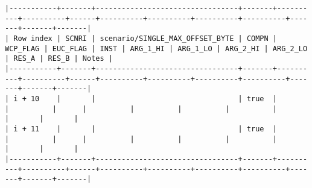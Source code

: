 \documentclass[varwidth=\maxdimen,margin=0.5cm,multi={verbatim}]{standalone}
\begin{document}
\begin{verbatim}
|-----------+-------+---------------------------------+-------+----------+----------+------+----------+----------+----------+----------+-------+-------+-------|
| Row index | SCNRI | scenario/SINGLE_MAX_OFFSET_BYTE | COMPN | WCP_FLAG | EUC_FLAG | INST | ARG_1_HI | ARG_1_LO | ARG_2_HI | ARG_2_LO | RES_A | RES_B | Notes |
|-----------+-------+---------------------------------+-------+----------+----------+------+----------+----------+----------+----------+-------+-------+-------|
| i + 10    |       |                                 | true  |          |          |      |          |          |          |          |       |       |       |
| i + 11    |       |                                 | true  |          |          |      |          |          |          |          |       |       |       |
|-----------+-------+---------------------------------+-------+----------+----------+------+----------+----------+----------+----------+-------+-------+-------|

\end{verbatim}
\end{document}
